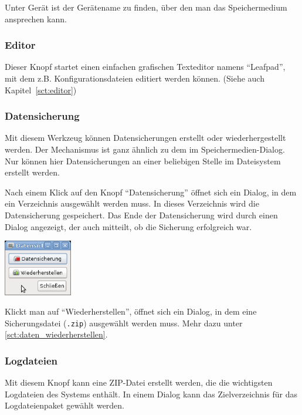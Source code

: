 \documentclass[a4paper,12pt,twoside]{article}
\begin{document}
Unter Gerät ist der Gerätename zu finden, über den man das
Speichermedium ansprechen kann.


\subsubsection{Editor}
\label{sct:gui_editor}
Dieser Knopf startet einen einfachen
grafischen Texteditor namens "`Leafpad"', mit
dem z.B. Konfigurationsdateien editiert werden können. (Siehe auch
Kapitel~\ref{sct:editor})


\subsubsection{Datensicherung}
\label{sct:dialog_datensicherung}
Mit diesem Werkzeug können
Datensicherungen erstellt oder wiederhergestellt werden. Der
Mechanismus ist ganz ähnlich zu dem im Speichermedien-Dialog. Nur
können hier Datensicherungen an einer beliebigen Stelle im Dateisystem
erstellt werden.

Nach einem Klick auf den Knopf
"`Datensicherung"' öffnet sich ein Dialog, in
dem ein Verzeichnis ausgewählt werden muss. In dieses Verzeichnis wird
die Datensicherung gespeichert. Das Ende der Datensicherung wird durch
einen Dialog angezeigt, der auch mitteilt, ob die Sicherung erfolgreich
war.

\bigskip
\begin{minipage}{\linewidth}
    \centering
    \captionsetup{type=figure}
    \includegraphics[width=3cm]{screenshots/efaLivede-img21.png}
    \label{fig:dialog_datensicherung}
\end{minipage}
\bigskip

Klickt man auf "`Wiederherstellen"', öffnet
sich ein Dialog, in dem eine Sicherungsdatei (\texttt{.zip})
ausgewählt werden muss. Mehr dazu unter \ref{sct:daten_wiederherstellen}.


\subsubsection{Logdateien}
\label{sct:logfiles}
Mit diesem Knopf kann eine ZIP-Datei erstellt werden, die die wichtigsten
Logdateien des Systems enthält. In einem Dialog kann das Zielverzeichnis 
für das Logdateienpaket gewählt werden.
\end{document}
